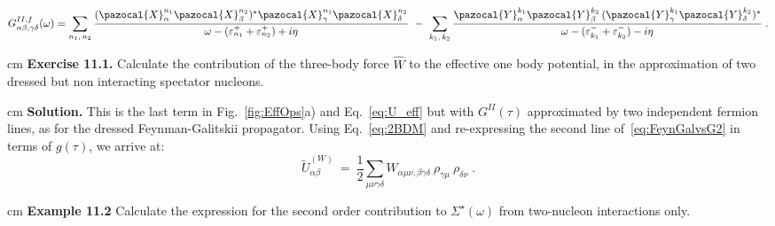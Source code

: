 \begin{equation}
G^{II,f}_{\alpha \beta, \gamma \delta}(\omega) =
\sum_{n_1, \, n_2} \frac{(\pazocal{X}^{n_1}_\alpha \pazocal{X}^{n_2}_\beta)^*  \pazocal{X}^{n_1}_\gamma \pazocal{X}^{n_2}_\delta}
                      {\omega  - (\varepsilon^+_{n_1}  + \varepsilon^+_{n_2}) + i\eta} 
~-~ \sum_{k_1, \, k_2} \frac{\pazocal{Y}^{k_1}_\alpha \pazocal{Y}^{k_2}_\beta \, (\pazocal{Y}^{k_1}_\gamma \pazocal{Y}^{k_2}_\delta)^*}
                     {\omega  - (\varepsilon^-_{k_1} + \varepsilon^-_{k_2}) - i\eta}   \; .
\label{eq:GIIf}
\end{equation}




 cm
\noindent
{\bf Exercise 11.1.} Calculate the contribution of the three-body force $\widehat W$ to the  effective one body potential, in the approximation of 
two dressed but non interacting spectator nucleons.

 cm
\noindent
{\bf Solution.}  This is the last term in Fig.~\ref{fig:EffOps}a) and Eq.~\eqref{eq:U_eff} but with $G^{II}(\tau)$ approximated by two independent fermion lines, as for the dressed Feynman-Galitskii propagator. Using Eq.~\eqref{eq:2BDM} and re-expressing the second line of~\eqref{eq:FeynGalvsG2} in terms of $g(\tau)$, we arrive at:
\begin{equation}
\label{eq:ueff_3b_first}
 \widetilde{U}^{(W)}_{\alpha\beta} ~=~ \frac{1}{2} \sum_{\mu \nu \gamma \delta}W_{\alpha\mu\nu,\beta\gamma\delta}
               ~\rho_{\gamma\mu}~\rho_{\delta\nu}  \; .
\end{equation}


 cm
\noindent
{\bf Example 11.2} Calculate the expression for the second order contribution to $\Sigma^\star(\omega)$ from two-nucleon interactions only.

